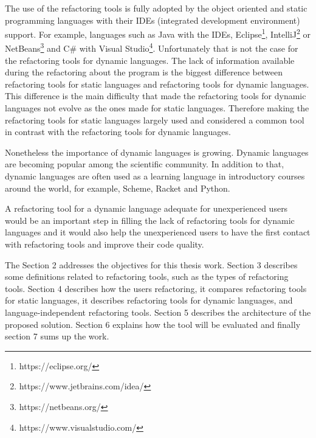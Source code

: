 The use of the refactoring tools is fully adopted by the object oriented and static programming languages with their IDEs (integrated development environment) support.
For example, languages such as Java with the IDEs, Eclipse\footnote{https://eclipse.org/}, IntelliJ\footnote{https://www.jetbrains.com/idea/} or NetBeans\footnote{https://netbeans.org/} and C\# with Visual Studio\footnote{https://www.visualstudio.com/}.
Unfortunately that is not the case for the refactoring tools for dynamic languages. 
The lack of information available during the refactoring about the program is the biggest difference between refactoring tools for static languages and refactoring tools for dynamic languages.
This difference is the main difficulty that made the refactoring tools for dynamic languages not evolve as the ones made for static languages. 
Therefore making the refactoring tools for static languages largely used and considered a common tool in contrast with the refactoring tools for dynamic languages.  %

Nonetheless the importance of dynamic languages is growing. Dynamic languages are becoming popular among the scientific community.
In addition to that, dynamic languages are often used as a learning language in introductory courses around the world, for example, Scheme, Racket and Python.

A refactoring tool for a dynamic language adequate for unexperienced users would be an important step in filling the lack of refactoring tools for dynamic languages and it would also help the unexperienced users to have the first contact with refactoring tools and improve their code quality.



The Section 2 addresses the objectives for this thesis work. 
Section 3 describes some definitions related to refactoring tools, such as the types of refactoring tools.
Section 4 describes how the users refactoring, it compares refactoring tools for static languages, it describes refactoring tools for dynamic languages, and language-independent refactoring tools.
Section 5 describes the architecture of the proposed solution. 
Section 6 explains how the tool will be evaluated and finally section 7 sums up the work.






